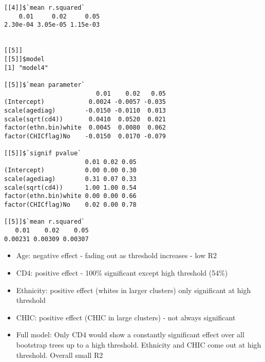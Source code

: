 \documentclass[]{revtex4}\usepackage[]{graphicx}\usepackage[]{color}
\makeatletter
\newenvironment{kframe}{%
 \def\at@end@of@kframe{}%
 \ifinner\ifhmode%
  \def\at@end@of@kframe{\end{minipage}}%
  \begin{minipage}{\columnwidth}%
 \fi\fi%
 \def\FrameCommand##1{\hskip\@totalleftmargin \hskip-\fboxsep
 \colorbox{shadecolor}{##1}\hskip-\fboxsep
     \hskip-\linewidth \hskip-\@totalleftmargin \hskip\columnwidth}%
 \MakeFramed {\advance\hsize-\width
   \@totalleftmargin\z@ \linewidth\hsize
   \@setminipage}}%
 {\par\unskip\endMakeFramed%
 \at@end@of@kframe}
\newenvironment{knitrout}{}{} %
\makeatother
\begin{document}
\begin{knitrout}
\begin{kframe}
\begin{verbatim}
[[4]]$`mean r.squared`
    0.01     0.02     0.05 
2.30e-04 3.05e-05 1.15e-03 


[[5]]
[[5]]$model
[1] "model4"

[[5]]$`mean parameter`
                         0.01    0.02   0.05
(Intercept)            0.0024 -0.0057 -0.035
scale(agediag)        -0.0150 -0.0110  0.013
scale(sqrt(cd4))       0.0410  0.0520  0.021
factor(ethn.bin)white  0.0045  0.0080  0.062
factor(CHICflag)No    -0.0150  0.0170 -0.079

[[5]]$`signif pvalue`
                      0.01 0.02 0.05
(Intercept)           0.00 0.00 0.30
scale(agediag)        0.31 0.07 0.33
scale(sqrt(cd4))      1.00 1.00 0.54
factor(ethn.bin)white 0.00 0.00 0.66
factor(CHICflag)No    0.02 0.00 0.78

[[5]]$`mean r.squared`
   0.01    0.02    0.05 
0.00231 0.00309 0.00307 
\end{verbatim}
\end{kframe}
\end{knitrout}

\begin{itemize}
\item Age: negative effect - fading out as threshold increases - low R2
\item CD4: positive effect - 100\% significant except high threshold (54\%)
\item Ethnicity: positive effect (whites in larger clusters) only significant at high threshold
\item CHIC: positive effect (CHIC in large clusters) - not always significant
\item Full model: Only CD4 would show a constantly significant effect over all bootstrap trees up to a high threshold. Ethnicity and CHIC come out at high threshold. Overall small R2 
\end{itemize}
\end{document}
